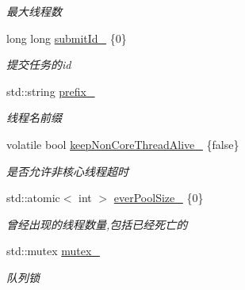 \begin{DoxyCompactItemize}
\begin{DoxyCompactList}\small\item\em 最大线程数 \end{DoxyCompactList}\item 
\mbox{\label{classThreadPoolExecutor_a780f59f4a475a0857dd4f833a50748dc}} 
long long \hyperlink{classThreadPoolExecutor_a780f59f4a475a0857dd4f833a50748dc}{submit\+Id\+\_\+} \{0\}
\begin{DoxyCompactList}\small\item\em 提交任务的id \end{DoxyCompactList}\item 
\mbox{\label{classThreadPoolExecutor_acf28232c8314da96403992137fdd1c2f}} 
std\+::string \hyperlink{classThreadPoolExecutor_acf28232c8314da96403992137fdd1c2f}{prefix\+\_\+}
\begin{DoxyCompactList}\small\item\em 线程名前缀 \end{DoxyCompactList}\item 
\mbox{\label{classThreadPoolExecutor_a2c8fc052c3760c89bf5198409d8c9c72}} 
volatile bool \hyperlink{classThreadPoolExecutor_a2c8fc052c3760c89bf5198409d8c9c72}{keep\+Non\+Core\+Thread\+Alive\+\_\+} \{false\}
\begin{DoxyCompactList}\small\item\em 是否允许非核心线程超时 \end{DoxyCompactList}\item 
\mbox{\label{classThreadPoolExecutor_ad8f4e68f28d617749537036f6e688b8c}} 
std\+::atomic$<$ int $>$ \hyperlink{classThreadPoolExecutor_ad8f4e68f28d617749537036f6e688b8c}{ever\+Pool\+Size\+\_\+} \{0\}
\begin{DoxyCompactList}\small\item\em 曾经出现的线程数量,包括已经死亡的 \end{DoxyCompactList}\item 
\mbox{\label{classThreadPoolExecutor_a2ef0eea2a8ca7a03bd9d361ced31f71b}} 
std\+::mutex \hyperlink{classThreadPoolExecutor_a2ef0eea2a8ca7a03bd9d361ced31f71b}{mutex\+\_\+}
\begin{DoxyCompactList}\small\item\em 队列锁 \end{DoxyCompactList}\item 

\end{DoxyCompactItemize}
